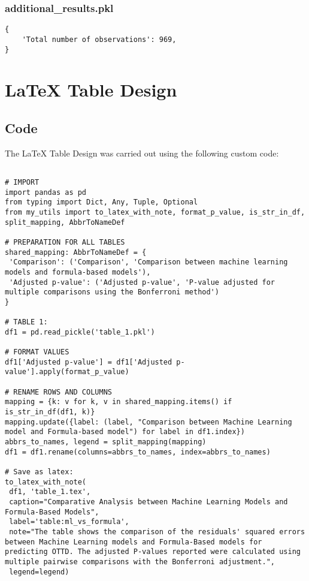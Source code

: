 \documentclass[11pt]{article}
\begin{document}
\subsubsection*{additional\_results.pkl}

\begin{Verbatim}[tabsize=4]
{
    'Total number of observations': 969,
}
\end{Verbatim}

\section{LaTeX Table Design}
\subsection{{Code}}
The LaTeX Table Design was carried out using the following custom code:

\begin{verbatim}

# IMPORT
import pandas as pd
from typing import Dict, Any, Tuple, Optional
from my_utils import to_latex_with_note, format_p_value, is_str_in_df, split_mapping, AbbrToNameDef

# PREPARATION FOR ALL TABLES
shared_mapping: AbbrToNameDef = {
 'Comparison': ('Comparison', 'Comparison between machine learning models and formula-based models'),
 'Adjusted p-value': ('Adjusted p-value', 'P-value adjusted for multiple comparisons using the Bonferroni method')
}

# TABLE 1:
df1 = pd.read_pickle('table_1.pkl')

# FORMAT VALUES
df1['Adjusted p-value'] = df1['Adjusted p-value'].apply(format_p_value)

# RENAME ROWS AND COLUMNS 
mapping = {k: v for k, v in shared_mapping.items() if is_str_in_df(df1, k)}
mapping.update({label: (label, "Comparison between Machine Learning model and Formula-based model") for label in df1.index})
abbrs_to_names, legend = split_mapping(mapping)
df1 = df1.rename(columns=abbrs_to_names, index=abbrs_to_names)

# Save as latex:
to_latex_with_note(
 df1, 'table_1.tex',
 caption="Comparative Analysis between Machine Learning Models and Formula-Based Models", 
 label='table:ml_vs_formula',
 note="The table shows the comparison of the residuals' squared errors between Machine Learning models and Formula-Based models for predicting OTTD. The adjusted P-values reported were calculated using multiple pairwise comparisons with the Bonferroni adjustment.",
 legend=legend)


\end{verbatim}
\end{document}

